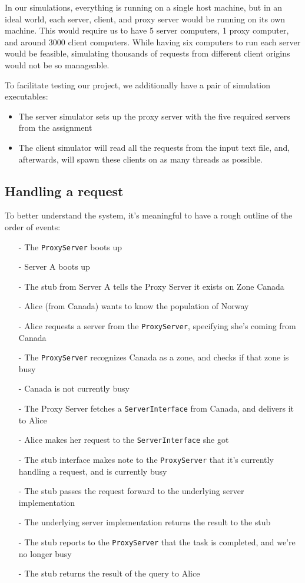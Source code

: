 \documentclass{article}
\def\code#1{\colorbox{gray!20}{\texttt{#1}}}
\begin{document}
In our simulations, everything is running on a single host machine, but in an ideal world, each server, client, and proxy server would be running on its own machine. This would require us to have 5 server computers, 1 proxy computer, and around 3000 client computers. While having six computers to run each server would be feasible, simulating thousands of requests from different client origins would not be so manageable.

To facilitate testing our project, we additionally have a pair of simulation executables:
\begin{itemize}
    \item The server simulator sets up the proxy server with the five required servers from the assignment 
    \item The client simulator will read all the requests from the input text file, and, afterwards, will spawn these clients on as many threads as possible.
\end{itemize}

\subsection{Handling a request}
To better understand the system, it's meaningful to have a rough outline of the order of events:

\begin{itemize}
\item[-] The \code{ProxyServer} boots up
\item[-] Server A boots up
\item[-] The stub from Server A tells the Proxy Server it exists on Zone Canada
\item[-] Alice (from Canada) wants to know the population of Norway
\item[-] Alice requests a server from the \code{ProxyServer}, specifying she's coming from Canada
\item[-] The \code{ProxyServer} recognizes Canada as a zone, and checks if that zone is busy
\item[-] Canada is not currently busy
\item[-] The Proxy Server fetches a \code{ServerInterface} from Canada, and delivers it to Alice
\item[-] Alice makes her request to the \code{ServerInterface} she got
\item[-] The stub interface makes note to the \code{ProxyServer} that it's currently handling a request, and is currently busy
\item[-] The stub passes the request forward to the underlying server implementation
\item[-] The underlying server implementation returns the result to the stub
\item[-] The stub reports to the \code{ProxyServer} that the task is completed, and we're no longer busy
\item[-] The stub returns the result of the query to Alice
\end{itemize}
\end{document}
